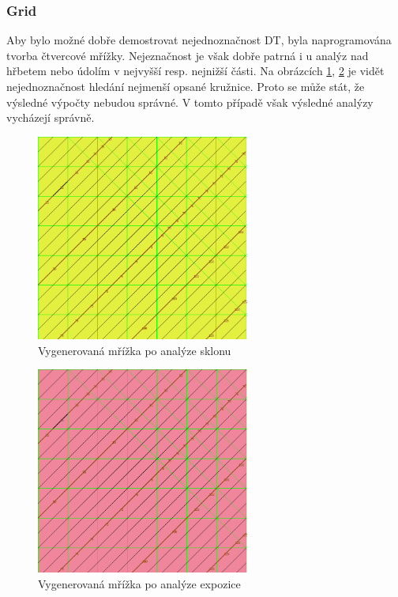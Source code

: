 \documentclass[a4paper,11pt,twoside]{article}
\begin{document}
\newpage
\vspace*{-1cm}
\subsubsection*{Grid}
Aby bylo možné dobře demostrovat nejednoznačnost DT, byla naprogramována tvorba čtvercové mřížky. Nejeznačnost je však dobře patrná i u analýz nad hřbetem nebo údolím v nejvyšší resp. nejnižší části. Na obrázcích \ref{fig:grid_slope}, \ref{fig:grid_aspect}  je vidět nejednoznačnost hledání nejmenší opsané kružnice. Proto se může stát, že výsledné výpočty nebudou správné. V tomto případě však výsledné analýzy vycházejí správně.

\vspace{0.2cm}
\begin{figure}[hbt!] 
\begin{center}
\includegraphics[width=7cm]{pictures/grid_slope.PNG} 
\caption[Vygenerovaná mřížka po analýze sklonu]{Vygenerovaná mřížka po analýze sklonu}
\label{fig:grid_slope}
\end{center}
\end{figure}

\vspace{0.2cm}
\begin{figure}[hbt!] 
\begin{center}
\includegraphics[width=7cm]{pictures/grid_aspect.PNG} 
\caption[Vygenerovaná mřížka po analýze expozice]{Vygenerovaná mřížka po analýze expozice}
\label{fig:grid_aspect}
\end{center}
\end{figure}
\end{document}
